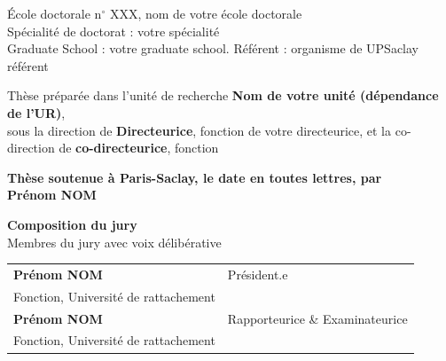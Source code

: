\documentclass[main.tex]{subfiles}
\begin{document}
\begin{titlepage}
\small École doctorale n$^{\circ}$ XXX, nom de votre école doctorale\\
\small Spécialité de doctorat : votre spécialité\\
\small Graduate School : votre graduate school. Référent : organisme de UPSaclay référent \\
\vspace{6mm}

{\footnotesize Thèse préparée dans l'unité de recherche \textbf{Nom de votre unité (dépendance de l'UR)},\\sous la direction de \textbf{Directeurice}, fonction de votre directeurice, et la co-direction de \textbf{co-directeurice}, fonction}\\
\vspace{15mm}

\textbf{Thèse soutenue à Paris-Saclay, le date en toutes lettres, par}\\
\bigskip
\Large {\color{Prune} \textbf{Prénom NOM}} %

\vspace{\fill} %


\flushleft
\small {\color{Prune} \textbf{Composition du jury}}\\
{\color{Prune} \scriptsize {Membres du jury avec voix délibérative}} \\
\vspace{2mm}
\scriptsize
\begin{tabular}{|p{7cm}l}
\arrayrulecolor{Prune}
\textbf{Prénom NOM} &  Président.e \vspace{-.5ex}\\ 
Fonction, Université de rattachement   &   \\ 
\textbf{Prénom NOM} &  Rapporteurice \& Examinateurice\vspace{-.5ex}\\ 
Fonction, Université de rattachement  &  
\end{tabular}

\end{titlepage}
\end{document}
